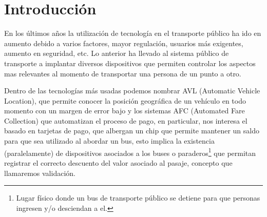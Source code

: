 \documentclass[12pt]{article}
\begin{document}


        \tableofcontents   %

        \listoftables 	 %

        \listoffigures   %

        \newpage



        \newpage
        \section{Introducción}


        En los últimos años la utilización de tecnología en el transporte público ha ido en aumento debido a varios factores, mayor regulación, usuarios más exigentes, aumento en seguridad, etc. Lo anterior ha llevado al sistema público de transporte a implantar diversos dispositivos que permiten controlar los aspectos mas relevantes al momento de transportar una persona de un punto a otro.

        Dentro de las tecnologías más usadas podemos nombrar AVL (Automatic Vehicle Location), que permite conocer la posición geográfica de un vehículo en todo momento con un margen de error bajo y los sistemas AFC (Automated Fare Collection) que automatizan el proceso de pago, en particular, nos interesa el basado en tarjetas de pago, que albergan un chip que permite mantener un saldo para que sea utilizado al abordar un bus, esto implica la existencia (paralelamente) de dispositivos asociados a los buses o paraderos\footnote{Lugar físico donde un bus de transporte público se detiene para que personas ingresen y/o desciendan a el.} que permitan registrar el correcto descuento del valor asociado al pasaje, concepto que llamaremos validación.
\end{document}
